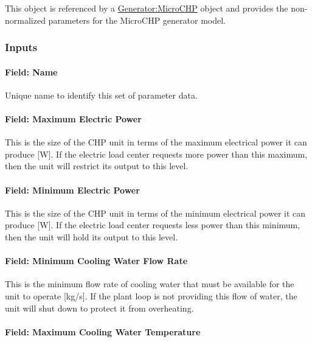 This object is referenced by a \hyperref[generatormicrochp]{Generator:MicroCHP} object and provides the non-normalized parameters for the MicroCHP generator model.

\subsubsection{Inputs}\label{inputs-11-003}

\paragraph{Field: Name}\label{field-name-12-002}

Unique name to identify this set of parameter data.

\paragraph{Field: Maximum Electric Power}\label{field-maximum-electric-power}

This is the size of the CHP unit in terms of the maximum electrical power it can produce {[}W{]}. If the electric load center requests more power than this maximum, then the unit will restrict its output to this level.

\paragraph{Field: Minimum Electric Power}\label{field-minimum-electric-power}

This is the size of the CHP unit in terms of the minimum electrical power it can produce {[}W{]}. If the electric load center requests less power than this minimum, then the unit will hold its output to this level.

\paragraph{Field: Minimum Cooling Water Flow Rate}\label{field-minimum-cooling-water-flow-rate}

This is the minimum flow rate of cooling water that must be available for the unit to operate {[}kg/s{]}. If the plant loop is not providing this flow of water, the unit will shut down to protect it from overheating.

\paragraph{Field: Maximum Cooling Water Temperature}\label{field-maximum-cooling-water-temperature}


